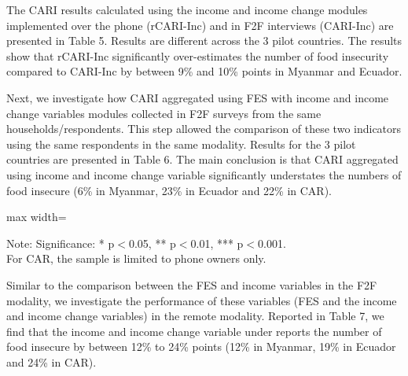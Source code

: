\documentclass[11pt,harvard]{article}
\begin{document}
The CARI results calculated using the income and income change modules implemented over the phone (rCARI-Inc) and in F2F interviews (CARI-Inc) are presented in Table 5. Results are different across the 3 pilot countries. The results show that rCARI-Inc significantly over-estimates the number of food insecurity compared to CARI-Inc by between 9\% and 10\% points in Myanmar and Ecuador. 

Next, we investigate how CARI aggregated using FES with income and income change variables modules collected in F2F surveys from the same households/respondents. This step allowed the comparison of these two indicators using the same respondents in the same modality. Results for the 3 pilot countries are presented in Table 6. The main conclusion is that CARI aggregated using income and income change variable significantly understates the numbers of food insecure (6\% in Myanmar, 23\% in Ecuador and 22\% in CAR).

\begin{table}[htbp]
	\centering
	\begin{adjustbox}{max width=\textwidth}
		\begin{threeparttable}
			\caption{Impact of Indicator Composition: Paired CARI-FES vs. CARI-Inc in F2F Surveys}
			\scriptsize
			 
			\label{tab:Paired_F2F_CARI_FES_INC_All_Country}
			\begin{tablenotes}
				\item Note: Significance: * p$<$0.05, ** p$<$0.01, *** p$<$0.001. \\
				For CAR, the sample is limited to phone owners only.
			\end{tablenotes}
		\end{threeparttable}
	\end{adjustbox}
\end{table}

Similar to the comparison between the FES and income variables in the F2F modality, we investigate the performance of these variables (FES and the income and income change variables) in the remote modality. Reported in Table 7, we find that the income and income change variable under reports the number of food insecure by between 12\% to 24\% points (12\% in Myanmar, 19\% in Ecuador and 24\% in CAR). 
\end{document}
